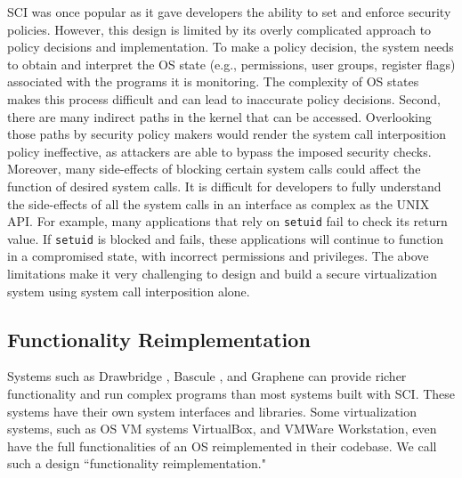 SCI was once popular 
as it gave developers the ability to set and enforce security policies. 
However, this design
is limited by its overly complicated approach to policy decisions and implementation.
To make a policy decision, the system needs to
obtain and interpret the OS state (e.g., permissions, user groups, register flags) 
associated with the programs it is monitoring.
The complexity of OS states makes this process difficult and can lead to
inaccurate policy decisions.
Second, there are many indirect paths in the kernel that can be accessed.
Overlooking those paths by security policy makers would render the
system call interposition policy ineffective, as attackers are able to
bypass the imposed security checks. 
Moreover, many side-effects of blocking
certain system calls could affect the function of desired system calls.
It is difficult for developers to fully understand the side-effects of all the
system calls in an interface as complex as the UNIX API. 
For example, many applications that rely on \texttt{setuid} fail to check its return value. 
If \texttt{setuid} is blocked and fails, these applications will continue to function in a compromised state, 
with incorrect permissions and privileges. 
The above limitations make it very challenging to design and build a secure virtualization system using
system call interposition alone.

\subsection{Functionality Reimplementation}
Systems such as  Drawbridge \cite{Drawbridge-11},
 Bascule \cite{Bascule}, and Graphene \cite{Graphene-14} can
provide richer functionality and run complex programs than most systems built
with SCI. These systems have their own system
interfaces and libraries. Some virtualization
systems, such as OS VM systems VirtualBox, and VMWare Workstation, even have the
full functionalities of an OS reimplemented in their codebase. We call such a design
``functionality reimplementation."


